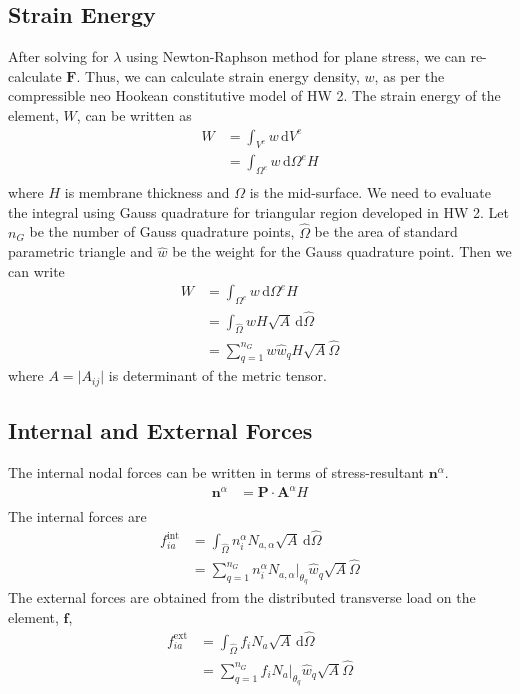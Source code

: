 \documentclass[../main.tex]{subfiles}
\begin{document}
\subsection{Strain Energy }
After solving for $\lambda$ using Newton-Raphson method for plane
stress, we can re-calculate $\mathbf{F}$. Thus, we can calculate
strain energy density, $w$, as per the compressible neo Hookean
constitutive model of HW 2. The strain energy of the element, $W$, can
be written as
\begin{align*}
  W &= \int_{V^e}\!w\, \mathrm{d}V^e\\
    &=\int_{\Omega^e}\!w\,\mathrm{d}\Omega^eH\\
\end{align*}
where $H$ is membrane thickness and $\Omega$ is the mid-surface. We
need to evaluate the integral using Gauss quadrature for triangular
region developed in HW 2. Let $n_G$ be the number of Gauss quadrature
points, $\hat{\Omega}$ be the area of standard parametric triangle and
$\hat{w}$ be the weight for the Gauss quadrature point. Then we can
write
\begin{align*}
  W &=\int_{\Omega^e}\! w \, \mathrm{d}\Omega^eH\\
    &=\int_{\hat{\Omega}}\! wH\sqrt{A} \, \mathrm{d}\hat{\Omega}\\
    &=\sum_{q=1}^{n_G}w\hat{w}_qH\sqrt{A}\hat{\Omega}
\end{align*}
where $A = \lvert A_{ij}\lvert$ is determinant of the metric tensor.
\subsection{Internal and External Forces}
The internal nodal forces can be written in terms of stress-resultant
$\mathbf{n}^{\alpha}$.
\begin{align*}
  \mathbf{n}^{\alpha} &= \mathbf{P}\cdot\mathbf{A}^{\alpha} H \\
\end{align*}
The internal forces are
\begin{align*}
  f_{ia}^{\text{int}} &= \int_{\hat{\Omega}}\! n_i^{\alpha}N_{a,\alpha}\sqrt{A} \, \mathrm{d}\hat{\Omega}\\
                      &=\sum_{q=1}^{n_G}n_i^{\alpha}N_{a,\alpha}\bigg\lvert_{\theta_q}\hat{w}_q\sqrt{A}\hat{\Omega}
\end{align*}
The external forces are obtained from the distributed transverse load
on the element, $\mathbf{f}$,
\begin{align*}
  f_{ia}^{\text{ext}} &= \int_{\hat{\Omega}}\! f_iN_a\sqrt{A}\, \mathrm{d}\hat{\Omega}\\
                      &=\sum_{q=1}^{n_G}f_iN_a\bigg\lvert_{\theta_q}\hat{w}_q\sqrt{A}\hat{\Omega}
\end{align*}
\end{document}
